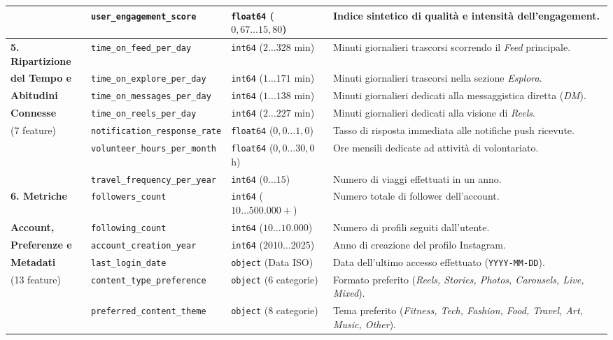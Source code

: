 \begin{table}[H]
{\begin{tabular}{llp{4.2cm}p{6.8cm}}
 & \texttt{user\_engagement\_score} & \texttt{float64} ($0,67 \dots 15,80$) & Indice sintetico di qualità e intensità dell'engagement. \\
\midrule
\textbf{5. Ripartizione} & \texttt{time\_on\_feed\_per\_day} & \texttt{int64} ($2 \dots 328$ min) & Minuti giornalieri trascorsi scorrendo il \emph{Feed} principale. \\
\textbf{del Tempo e} & \texttt{time\_on\_explore\_per\_day} & \texttt{int64} ($1 \dots 171$ min) & Minuti giornalieri trascorsi nella sezione \emph{Esplora}. \\
\textbf{Abitudini} & \texttt{time\_on\_messages\_per\_day} & \texttt{int64} ($1 \dots 138$ min) & Minuti giornalieri dedicati alla messaggistica diretta (\emph{DM}). \\
\textbf{Connesse} & \texttt{time\_on\_reels\_per\_day} & \texttt{int64} ($2 \dots 227$ min) & Minuti giornalieri dedicati alla visione di \emph{Reels}. \\
(7 feature) & \texttt{notification\_response\_rate} & \texttt{float64} ($0,0 \dots 1,0$) & Tasso di risposta immediata alle notifiche push ricevute. \\
 & \texttt{volunteer\_hours\_per\_month} & \texttt{float64} ($0,0 \dots 30,0$ h) & Ore mensili dedicate ad attività di volontariato. \\
 & \texttt{travel\_frequency\_per\_year} & \texttt{int64} ($0 \dots 15$) & Numero di viaggi effettuati in un anno. \\
\midrule
\textbf{6. Metriche} & \texttt{followers\_count} & \texttt{int64} ($10 \dots 500.000+$) & Numero totale di follower dell'account. \\
\textbf{Account,} & \texttt{following\_count} & \texttt{int64} ($10 \dots 10.000$) & Numero di profili seguiti dall'utente. \\
\textbf{Preferenze e} & \texttt{account\_creation\_year} & \texttt{int64} ($2010 \dots 2025$) & Anno di creazione del profilo Instagram. \\
\textbf{Metadati} & \texttt{last\_login\_date} & \texttt{object} (Data ISO) & Data dell'ultimo accesso effettuato (\texttt{YYYY-MM-DD}). \\
(13 feature) & \texttt{content\_type\_preference} & \texttt{object} (6 categorie) & Formato preferito (\emph{Reels, Stories, Photos, Carousels, Live, Mixed}). \\
 & \texttt{preferred\_content\_theme} & \texttt{object} (8 categorie) & Tema preferito (\emph{Fitness, Tech, Fashion, Food, Travel, Art, Music, Other}). \\

\end{tabular}}
\end{table}
